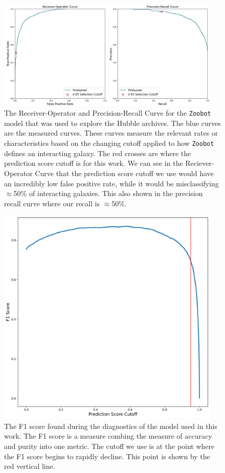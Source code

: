 \begin{figure}
  \centering
  \includegraphics[width = 0.95\textwidth]{Chapter2/figures/fig14.jpg}
  \caption{The Receiver-Operator and Precision-Recall Curve for the \texttt{Zoobot} model that was used to explore the Hubble archives. The blue curves are the measured curves. These curves measure the relevant rates or characteristics based on the changing cutoff applied to how \texttt{Zoobot} defines an interacting galaxy. The red crosses are where the prediction score cutoff is for this work. We can see in the Reciever-Operator Curve that the prediction score cutoff we use would have an incredibly low false positive rate, while it would be misclassifying $\approx$50\% of interacting galaxies. This also shown in the precision recall curve where our recall is $\approx$50\%.}
  \label{fig:pr-roc-curves}
\end{figure}

\begin{figure}
    \centering
    \includegraphics[width = 0.95\textwidth]{Chapter2/figures/fig15.pdf}
    \caption{The F1 score found during the diagnostics of the model used in this work. The F1 score is a measure combing the measure of accuracy and purity into one metric. The cutoff we use is at the point where the F1 score begins to rapidly decline. This point is shown by the red vertical line.}
    \label{fig:f1-score}
\end{figure}

